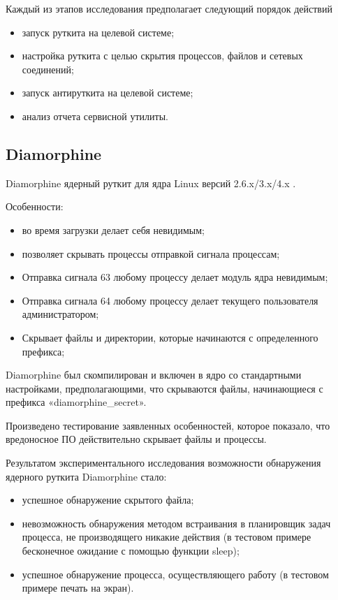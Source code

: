 \documentclass{gost7.32-2001}
\begin{document}
Каждый из этапов исследования предполагает следующий порядок действий
\begin{itemize}
\item
  запуск руткита на целевой системе;
\item
  настройка руткита с целью скрытия процессов, файлов и сетевых
  соединений;
\item
  запуск антируткита на целевой системе;
\item
  анализ отчета сервисной утилиты.
\end{itemize}

\subsection{Diamorphine}

Diamorphine \dash ядерный руткит для ядра Linux версий 2.6.x/3.x/4.x
.

Особенности:
\begin{itemize}
\item
  во время загрузки делает себя невидимым;
\item
  позволяет скрывать процессы отправкой сигнала процессам;
\item
  Отправка сигнала 63 любому процессу делает модуль ядра невидимым;
\item
  Отправка сигнала 64 любому процессу делает текущего пользователя
  администратором;
\item
  Скрывает файлы и директории, которые начинаются с определенного
  префикса;
\end{itemize}

Diamorphine был скомпилирован и включен в ядро со стандартными
настройками, предполагающими, что скрываются файлы, начинающиеся с
префикса «diamorphine\_secret».

Произведено тестирование заявленных особенностей, которое показало,
что вредоносное ПО действительно скрывает файлы и процессы.

Результатом экспериментального исследования возможности обнаружения
ядерного руткита Diamorphine стало:
\begin{itemize}
\item
  успешное обнаружение скрытого файла;
\item
  невозможность обнаружения методом встраивания в планировщик задач
  процесса, не производящего никакие действия (в тестовом примере
  \dash бесконечное ожидание с помощью функции sleep);
\item
  успешное обнаружение процесса, осуществляющего работу (в тестовом
  примере \dash печать на экран).
\end{itemize}
\end{document}
